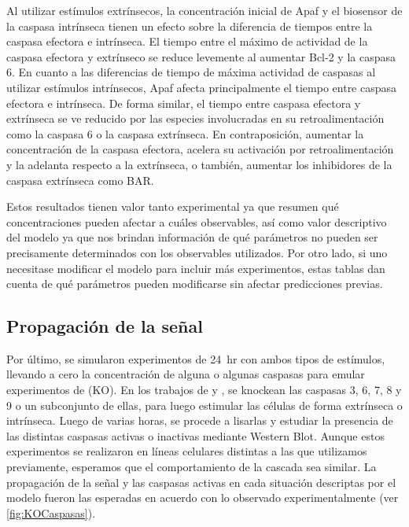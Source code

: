 Al utilizar estímulos extrínsecos, la concentración inicial de Apaf y el biosensor de la caspasa intrínseca tienen un efecto sobre la diferencia de tiempos entre la caspasa efectora e intrínseca. El tiempo entre el máximo de actividad de la caspasa efectora y extrínseco se reduce levemente al aumentar Bcl-2 y la caspasa 6. En cuanto a las diferencias de tiempo de máxima actividad de caspasas al utilizar estímulos intrínsecos, Apaf afecta principalmente el tiempo entre caspasa efectora e intrínseca. De forma similar, el tiempo entre caspasa efectora y extrínseca se ve reducido por las especies involucradas en su retroalimentación como la caspasa 6 o la caspasa extrínseca. En contraposición, aumentar la concentración de la caspasa efectora, acelera su activación por retroalimentación y la adelanta respecto a la extrínseca, o también, aumentar los inhibidores de la caspasa extrínseca como BAR.

Estos resultados tienen valor tanto experimental ya que resumen qué concentraciones pueden afectar a cuáles observables, así como valor descriptivo del modelo ya que nos brindan información de qué parámetros no pueden ser precisamente determinados con los observables utilizados. Por otro lado, si uno necesitase modificar el modelo para incluir más experimentos, estas tablas dan cuenta de qué parámetros pueden modificarse sin afectar predicciones previas.


\subsection{Propagación de la señal}

Por último, se simularon experimentos de 24~hr con ambos tipos de estímulos, llevando a cero la concentración de alguna o algunas caspasas para emular experimentos de  (KO). En los trabajos de \cite{Inoue2009} y \cite{McComb2019}, se knockean las caspasas 3, 6, 7, 8 y 9 o un subconjunto de ellas, para luego estimular las células de forma extrínseca o intrínseca. Luego de varias horas, se procede a lisarlas y estudiar la presencia de las distintas caspasas activas o inactivas mediante Western Blot. Aunque estos experimentos se realizaron en líneas celulares distintas a las que utilizamos previamente, esperamos que el comportamiento de la cascada sea similar. La propagación de la señal y las caspasas activas en cada situación descriptas por el modelo fueron las esperadas en acuerdo con lo observado experimentalmente (ver \cref{fig:KOCaspasas}).

